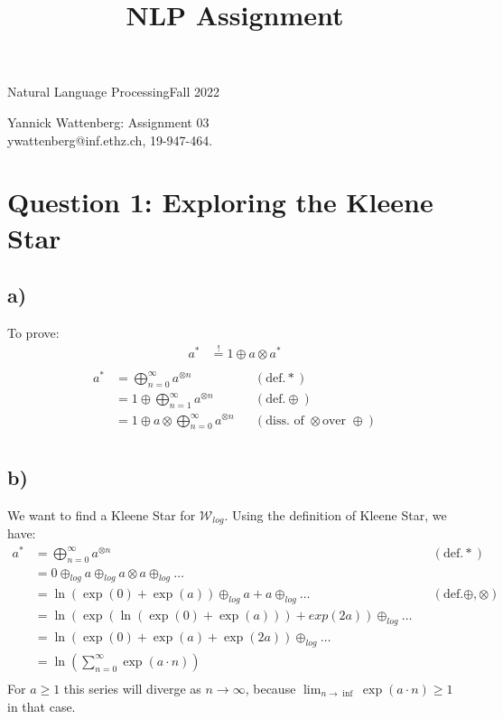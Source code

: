 \documentclass[a4paper,12pt]{ETHexercise}
\title{NLP Assignment}
\begin{document}



{}
{\Large Natural Language Processing}{Fall 2022}
\begin{center}
    {\Huge Yannick Wattenberg: Assignment 03}\\
      \quad\newline
      ywattenberg@inf.ethz.ch, 19-947-464.\\
      \quad\newline
    \timestamp

\end{center}
\section*{Question 1: Exploring the Kleene Star}
\subsection*{a)}
To prove: 
\begin{align*}
    a^* &\stackrel{!}{=} 1 \oplus a \otimes a^* \\
\end{align*}
\begin{align}
    a^* &= \bigoplus^{\infty}_{n=0}a^{\otimes n} &&(\text{def.} *)\\
    &= 1 \oplus \bigoplus^{\infty}_{n=1}a^{\otimes n}  &&(\text{def.} \oplus)\\
    &= 1 \oplus a \otimes \bigoplus^{\infty}_{n=0}a^{\otimes n}  &&(\text{diss. of } \otimes \text{over } \oplus)\\
\end{align}

\subsection*{b)}
We want to find a Kleene Star for $\mathcal{W}_{log}$. Using the definition of Kleene Star, we have:
\begin{align}
    a^* &= \bigoplus^{\infty}_{n=0}a^{\otimes n} &&(\text{def.} *)\\
     &= 0 \oplus_{log} a \oplus_{log} a \otimes a \oplus_{log} \dots\\
     &= \ln(\exp(0) + \exp(a)) \oplus_{log} a + a \oplus_{log} \dots &&(\text{def.} \oplus, \otimes)\\
     &= \ln(\exp(\ln(\exp(0) + \exp(a))) + exp(2a)) \oplus_{log} \dots \\
     &= \ln(\exp(0) + \exp(a)+ \exp(2a)) \oplus_{log} \dots \\
     &= \ln(\sum^\infty_{n=0} \exp(a \cdot n))\\
\end{align}
For $a \geq 1$ this series will diverge as $n \to \infty $, because $\lim_{n \to \inf} \exp(a\cdot n) \geq 1$ in that case.
\end{document}
